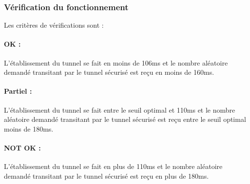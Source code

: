 \documentclass[a4paper,11pt,french]{article}
\begin{document}
\subsubsection{Vérification du fonctionnement}
	Les critères de vérifications sont :
\paragraph{OK : } L'établissement du tunnel se fait en moins de 106ms et le
nombre aléatoire demandé transitant par le tunnel sécurisé est reçu en
moins de 160ms.
\paragraph{Partiel : } L'établissement du tunnel se fait entre le seuil
optimal et 110ms et le nombre aléatoire demandé transitant par le tunnel
sécurisé est reçu entre le seuil optimal moins de 180ms.
\paragraph{NOT OK : } L'établissement du tunnel se fait en plus de 110ms et
le nombre aléatoire demandé transitant par le tunnel sécurisé est reçu en
plus de 180ms.
\end{document}
